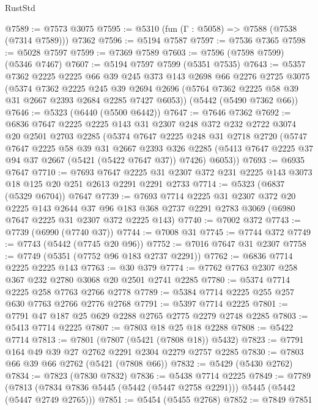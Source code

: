 \begin{lexlean}{RustStd}
\begin{coremodule}
@7589 := @7573 @3075
@7595 := @5310 (fun (Γ : @5058) => @7588 (@7538 (@7314 @7589))) @7362
@7596 := @5194 @7587
@7597 := @7536 @7365
@7598 := @5028 @7597
@7599 := @7369 @7589
@7603 := @7596 (@7598 @7599) (@5346 @7467)
@7607 := @5194 @7597 @7599 (@5351 @7535)
@7643 := @5357
    @7362
    @2225
    @2225
    @66
    @39
    @245
    @373
    @143
    @2698
    @66
    @2276
    @2725
    @3075
    (@5374
      @7362
      @2225
      @245
      @39
      @2694
      @2696
      (@5764 @7362 @2225 @58 @39 @31 @2667 @2393 @2684 @2285 @7427 @6053))
    (@5442 (@5490 @7362 @66))
@7646 := @5323 (@6440 (@5500 @6442))
@7647 := @7646 @7362
@7692 := @6836
    @7647
    @2225
    @2225
    @143
    @31
    @2307
    @248
    @372
    @232
    @2722
    @3074
    @20
    @2501
    @2703
    @2285
    (@5374
      @7647
      @2225
      @248
      @31
      @2718
      @2720
      (@5747
        @7647
        @2225
        @58
        @39
        @31
        @2667
        @2393
        @326
        @2285
        (@5413 @7647 @2225 @37 @94 @37 @2667 (@5421 (@5422 @7647 @37)) @7426)
        @6053))
@7693 := @6935 @7647
@7710 := @7693
    @7647
    @2225
    @31
    @2307
    @372
    @231
    @2225
    @143
    @3073
    @18
    @125
    @20
    @251
    @2613
    @2291
    @2291
    @2733
@7714 := @5323 (@6837 (@5329 @6704)) @7647
@7739 := @7693
    @7714
    @2225
    @31
    @2307
    @372
    @20
    @2225
    @143
    @2644
    @37
    @96
    @183
    @368
    @2737
    @2291
    @2783
    @3069
    (@6980 @7647 @2225 @31 @2307 @372 @2225 @143)
@7740 := @7002 @372
@7743 := @7739 (@6990 (@7740 @37))
@7744 := @7008 @31
@7745 := @7744 @372
@7749 := @7743 (@5442 (@7745 @20 @96))
@7752 := @7016 @7647 @31 @2307
@7758 := @7749 (@5351 (@7752 @96 @183 @2737 @2291))
@7762 := @6836 @7714 @2225 @2225 @143
@7763 := @30 @379
@7774 := @7762 @7763 @2307 @258 @367 @232 @2780 @3068 @20 @2501 @2741 @2285
@7780 := @5374 @7714 @2225 @258 @7763 @2766 @2778
@7789 := @5384 @7714 @2225 @255 @257 @630 @7763 @2766 @2776 @2768
@7791 := @5397 @7714 @2225
@7801 := @7791 @47 @187 @25 @629 @2288 @2765 @2775 @2279 @2748 @2285
@7803 := @5413 @7714 @2225
@7807 := @7803 @18 @25 @18 @2288
@7808 := @5422 @7714
@7813 := @7801 (@7807 (@5421 (@7808 @18)) @5432)
@7823 := @7791 @164 @49 @39 @27 @2762 @2291 @2304 @2279 @2757 @2285
@7830 := @7803 @66 @39 @66 @2762 (@5421 (@7808 @66))
@7832 := @5429 (@5430 @2762)
@7834 := @7823 (@7830 @7832)
@7836 := @5438 @7714 @2225
@7849 := @7789
    (@7813 (@7834 @7836 @5445 (@5442 (@5447 @2758 @2291))) @5445 (@5442 (@5447 @2749 @2765)))
@7851 := @5454 (@5455 @2768)
@7852 := @7849 @7851

\end{coremodule}
\end{lexlean}
